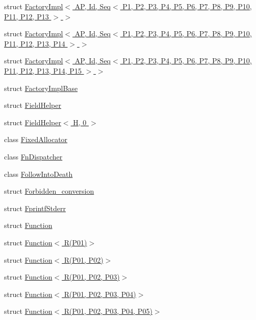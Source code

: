 \begin{DoxyCompactItemize}
\item 
struct \hyperlink{structLoki_1_1FactoryImpl_3_01AP_00_01Id_00_01Seq_3_01P1_00_01P2_00_01P3_00_01P4_00_01P5_00_01P627427229cbdd523be62dd804a58aab17}{Factory\+Impl$<$ A\+P, Id, Seq$<$ P1, P2, P3, P4, P5, P6, P7, P8, P9, P10, P11, P12, P13 $>$ $>$}
\item 
struct \hyperlink{structLoki_1_1FactoryImpl_3_01AP_00_01Id_00_01Seq_3_01P1_00_01P2_00_01P3_00_01P4_00_01P5_00_01P6850e1763a62dd9e7d17183f42343611c}{Factory\+Impl$<$ A\+P, Id, Seq$<$ P1, P2, P3, P4, P5, P6, P7, P8, P9, P10, P11, P12, P13, P14 $>$ $>$}
\item 
struct \hyperlink{structLoki_1_1FactoryImpl_3_01AP_00_01Id_00_01Seq_3_01P1_00_01P2_00_01P3_00_01P4_00_01P5_00_01P6310ce2dccd75834a83a6346079bbe494}{Factory\+Impl$<$ A\+P, Id, Seq$<$ P1, P2, P3, P4, P5, P6, P7, P8, P9, P10, P11, P12, P13, P14, P15 $>$ $>$}
\item 
struct \hyperlink{structLoki_1_1FactoryImplBase}{Factory\+Impl\+Base}
\item 
struct \hyperlink{structLoki_1_1FieldHelper}{Field\+Helper}
\item 
struct \hyperlink{structLoki_1_1FieldHelper_3_01H_00_010_01_4}{Field\+Helper$<$ H, 0 $>$}
\item 
class \hyperlink{classLoki_1_1FixedAllocator}{Fixed\+Allocator}
\item 
class \hyperlink{classLoki_1_1FnDispatcher}{Fn\+Dispatcher}
\item 
class \hyperlink{classLoki_1_1FollowIntoDeath}{Follow\+Into\+Death}
\item 
struct \hyperlink{structLoki_1_1Forbidden__conversion}{Forbidden\+\_\+conversion}
\item 
struct \hyperlink{structLoki_1_1FprintfStderr}{Fprintf\+Stderr}
\item 
struct \hyperlink{structLoki_1_1Function}{Function}
\item 
struct \hyperlink{structLoki_1_1Function_3_01R_07P01_08_4}{Function$<$ R(\+P01)$>$}
\item 
struct \hyperlink{structLoki_1_1Function_3_01R_07P01_00_01P02_08_4}{Function$<$ R(\+P01, P02)$>$}
\item 
struct \hyperlink{structLoki_1_1Function_3_01R_07P01_00_01P02_00_01P03_08_4}{Function$<$ R(\+P01, P02, P03)$>$}
\item 
struct \hyperlink{structLoki_1_1Function_3_01R_07P01_00_01P02_00_01P03_00_01P04_08_4}{Function$<$ R(\+P01, P02, P03, P04)$>$}
\item 
struct \hyperlink{structLoki_1_1Function_3_01R_07P01_00_01P02_00_01P03_00_01P04_00_01P05_08_4}{Function$<$ R(\+P01, P02, P03, P04, P05)$>$}

\end{DoxyCompactItemize}
